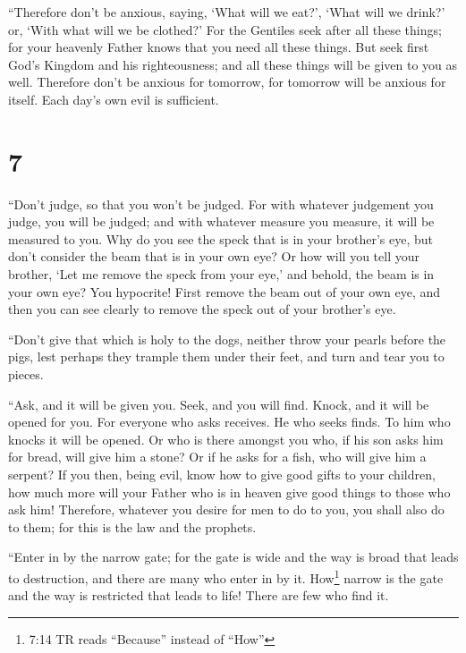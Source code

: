  ``Therefore don't be anxious, saying, `What will we eat?',
`What will we drink?' or, `With what will we be clothed?' 
For the Gentiles seek after all these things; for your heavenly Father
knows that you need all these things.  But seek first God's
Kingdom and his righteousness; and all these things will be given to you
as well.  Therefore don't be anxious for tomorrow, for
tomorrow will be anxious for itself. Each day's own evil is sufficient.

\hypertarget{section-6}{%
\section{7}\label{section-6}}

 ``Don't judge, so that you won't be judged. 
For with whatever judgement you judge, you will be judged; and with
whatever measure you measure, it will be measured to you. 
Why do you see the speck that is in your brother's eye, but don't
consider the beam that is in your own eye?  Or how will you
tell your brother, `Let me remove the speck from your eye,' and behold,
the beam is in your own eye?  You hypocrite! First remove
the beam out of your own eye, and then you can see clearly to remove the
speck out of your brother's eye.

 ``Don't give that which is holy to the dogs, neither throw
your pearls before the pigs, lest perhaps they trample them under their
feet, and turn and tear you to pieces.

 ``Ask, and it will be given you. Seek, and you will find.
Knock, and it will be opened for you.  For everyone who asks
receives. He who seeks finds. To him who knocks it will be opened.
 Or who is there amongst you who, if his son asks him for
bread, will give him a stone?  Or if he asks for a fish,
who will give him a serpent?  If you then, being evil, know
how to give good gifts to your children, how much more will your Father
who is in heaven give good things to those who ask him! 
Therefore, whatever you desire for men to do to you, you shall also do
to them; for this is the law and the prophets.

 ``Enter in by the narrow gate; for the gate is wide and
the way is broad that leads to destruction, and there are many who enter
in by it.  How\footnote{7:14 TR reads ``Because'' instead
  of ``How''} narrow is the gate and the way is restricted that leads to
life! There are few who find it.

